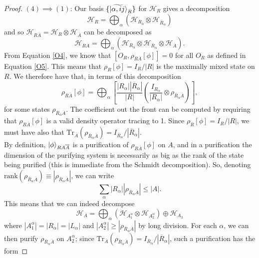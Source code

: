 \documentclass[12pt,a4paper]{report}
\numberwithin{equation}{section}
\newcommand{\ol}[1]{\overline{#1}}
\newcommand{\tr}{\text{Tr}}
\theoremstyle{definition}
\theoremstyle{theorem}
\theoremstyle{theorem}
\theoremstyle{example}
\theoremstyle{definition}
\begin{document}
\begin{proof}
	$(4)\implies (1)$: Our basis $\{\ket{\widetilde{\alpha,ij}}_{R}\}$ for $\mathcal{H}_{R}$ gives a decomposition
	\begin{equation}
		\mathcal{H}_{R}=\bigoplus_{\alpha}(\mathcal{H}_{R_{\alpha}}\otimes\mathcal{H}_{\ol{R}_{\alpha}})
	\end{equation}
	and so $\mathcal{H}_{R\ol{A}}=\mathcal{H}_{R}\otimes\mathcal{H}_{\ol{A}}$ can be decomposed as
	\begin{equation}
		\mathcal{H}_{R\ol{A}}=\bigoplus_{\alpha}(\mathcal{H}_{R_{\alpha}}\otimes\mathcal{H}_{\ol{R}_{\alpha}}\otimes\mathcal{H}_{\ol{A}}).
	\end{equation}
	From Equation \ref{O4}, we know that $[O_{R},\rho_{R\ol{A}}[\phi]]=0$ for all $O_{R}$ as defined in Equation \ref{O5}. This means that $\rho_{R}[\phi]=I_{R}/|R|$ is the maximally mixed state on $R$. We therefore have that, in terms of this decomposition
	\begin{equation}
		\rho_{R\ol{A}}[\phi]=\bigoplus_{\alpha}\left[\frac{|R_{\alpha}||\ol{R}_{\alpha}|}{|R|}\left(\frac{I_{R_{\alpha}}}{|R_{\alpha}|}\otimes\rho_{\ol{R}_{\alpha}\ol{A}}\right)\right],
	\end{equation}
	for some states $\rho_{\ol{R}_{\alpha}\ol{A}}$. The coefficient out the front can be computed by requiring that $\rho_{R\ol{A}}[\phi]$ is a valid density operator tracing to 1. Since $\rho_{R}[\phi]=I_{R}/|R|$, we must have also that $\tr_{\ol{A}}(\rho_{\ol{R}_{\alpha}\ol{A}})=I_{\ol{R}_{\alpha}}/|\ol{R}_{\alpha}|$.\\
	By definition, $\ket{\phi}_{RA\ol{A}}$ is a purification of $\rho_{R\ol{A}}[\phi]$ on $A$, and in a purification the dimension of the purifying system is necessarily as big as the rank of the state being purified (this is immediate from the Schmidt decomposition). So, denoting $\text{rank}(\rho_{\ol{R}_{\alpha}\ol{A}})\equiv|\rho_{\ol{R}_{\alpha}\ol{A}}|$, we can write
	\begin{equation}
		\sum_{\alpha}|R_{\alpha}||\rho_{\ol{R}_{\alpha}\ol{A}}|\leq|A|.
	\end{equation}
	This means that we can indeed decompose
	\begin{equation}
		\mathcal{H}_{A}=\bigoplus_{\alpha}(\mathcal{H}_{A_{1}^{\alpha}}\otimes\mathcal{H}_{A_{2}^{\alpha}})\oplus\mathcal{H}_{A_{3}}
	\end{equation}
	where $|A_{1}^{\alpha}|=|R_{\alpha}|=|L_{\alpha}|$ and $|A_{2}^{\alpha}|\geq|\rho_{\ol{R}_{\alpha}\ol{A}}|$ by long division. For each $\alpha$, we can then purify $\rho_{\ol{R}_{\alpha}\ol{A}}$ on $A_{2}^{\alpha}$; since $\tr_{\ol{A}}(\rho_{\ol{R}_{\alpha}\ol{A}})=I_{\ol{R}_{\alpha}}/|\ol{R}_{\alpha}|$, such a purification has the form

\end{proof}
\end{document}
